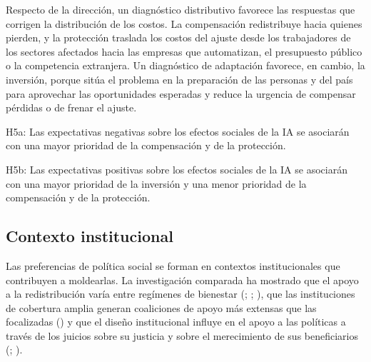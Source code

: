 \documentclass[
  spanish,
  12pt,
]{article}
\begin{document}
Respecto de la dirección, un diagnóstico distributivo favorece las
respuestas que corrigen la distribución de los costos. La compensación
redistribuye hacia quienes pierden, y la protección traslada los costos
del ajuste desde los trabajadores de los sectores afectados hacia las
empresas que automatizan, el presupuesto público o la competencia
extranjera. Un diagnóstico de adaptación favorece, en cambio, la
inversión, porque sitúa el problema en la preparación de las personas y
del país para aprovechar las oportunidades esperadas y reduce la
urgencia de compensar pérdidas o de frenar el ajuste.

\begin{tcolorbox}[enhanced jigsaw, arc=.35mm, bottomrule=.15mm, breakable, colback=white, colframe=quarto-callout-note-color-frame, left=2mm, leftrule=.75mm, opacityback=0, rightrule=.15mm, toprule=.15mm]

H5a: Las expectativas negativas sobre los efectos sociales de la IA se
asociarán con una mayor prioridad de la compensación y de la protección.

H5b: Las expectativas positivas sobre los efectos sociales de la IA se
asociarán con una mayor prioridad de la inversión y una menor prioridad
de la compensación y de la protección.

\end{tcolorbox}

\subsection{Contexto institucional}\label{contexto-institucional}

Las preferencias de política social se forman en contextos
institucionales que contribuyen a moldearlas. La investigación comparada
ha mostrado que el apoyo a la redistribución varía entre regímenes de
bienestar (; ;
), que las
instituciones de cobertura amplia generan coaliciones de apoyo más
extensas que las focalizadas () y que el diseño institucional influye en el apoyo a las
políticas a través de los juicios sobre su justicia y sobre el
merecimiento de sus beneficiarios
(;
).
\end{document}
